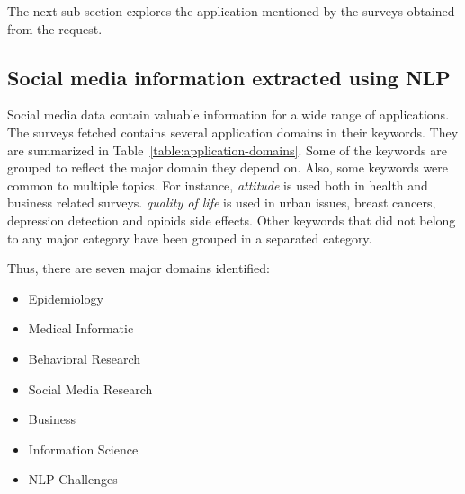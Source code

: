 The next sub-section explores the application mentioned by the surveys obtained from the request.

\subsection{Social media information extracted using NLP}
Social media data contain valuable information for a wide range of applications.
The surveys fetched contains several application domains in their keywords.
They are summarized in Table~\ref{table:application-domains}.
Some of the keywords are grouped to reflect the major domain they depend on.
Also, some keywords were common to multiple topics.
For instance, \emph{attitude} is used both in health and business related surveys.
\emph{quality of life} is used in urban issues, breast cancers, depression detection and opioids side effects.
Other keywords that did not belong to any major category have been grouped in a separated category.

Thus, there are seven major domains identified:

\begin{itemize}
    \item Epidemiology
    \item Medical Informatic
    \item Behavioral Research
    \item Social Media Research
    \item Business
    \item Information Science
    \item NLP Challenges
\end{itemize}

